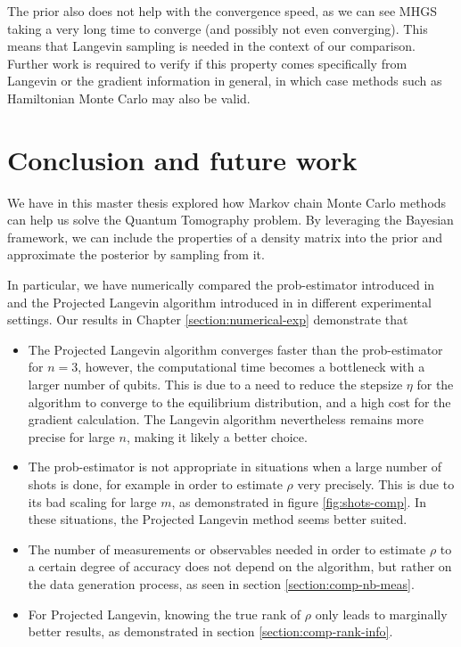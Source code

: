 \documentclass[12pt]{memoir}
\begin{document}
The prior also does not help with the convergence speed, as we can see MHGS taking a very long time to converge (and possibly not even converging). This means that Langevin sampling is needed in the context of our comparison. Further work is required to verify if this property comes specifically from Langevin or the gradient information in general, in which case methods such as Hamiltonian Monte Carlo may also be valid.


\chapter{Conclusion and future work}

We have in this master thesis explored how Markov chain Monte Carlo methods can help us solve the Quantum Tomography problem. By leveraging the Bayesian framework, we can include the properties of a density matrix into the prior and approximate the posterior by sampling from it.\medbreak


In particular, we have numerically compared the prob-estimator introduced in \cite{MA17} and the Projected Langevin algorithm introduced in \cite{meth:bayesian:Langevin:ACMT2024} in different experimental settings. Our results in Chapter \ref{section:numerical-exp} demonstrate that

\begin{itemize}

    \item The Projected Langevin algorithm converges faster than the prob-estimator for $n=3$, however, the computational time becomes a bottleneck with a larger number of qubits. This is due to a need to reduce the stepsize $\eta$ for the algorithm to converge to the equilibrium distribution, and a high cost for the gradient calculation. The Langevin algorithm nevertheless remains more precise for large $n$, making it likely a better choice.

    \item The prob-estimator is not appropriate in situations when a large number of shots is done, for example in order to estimate $\rho$ very precisely. This is due to its bad scaling for large $m$, as demonstrated in figure \ref{fig:shots-comp}. In these situations, the Projected Langevin method seems better suited.

    \item The number of measurements or observables needed in order to estimate $\rho$ to a certain degree of accuracy does not depend on the algorithm, but rather on the data generation process, as seen in section \ref{section:comp-nb-meas}.

    \item For Projected Langevin, knowing the true rank of $\rho$ only leads to marginally better results, as demonstrated in section \ref{section:comp-rank-info}.

\end{itemize}
\end{document}
